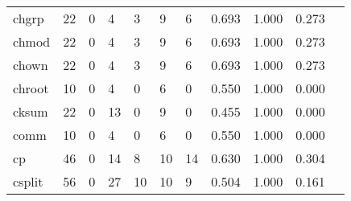 \begin{longtable}{lp{1.10cm}p{1.10cm}p{1.10cm}p{1.10cm}p{1.10cm}p{1.10cm}p{1.10cm}p{1.10cm}p{1.10cm}p{1.10cm}}
chgrp     &                     22 &                                  0 &                                 4 &                                3 &                                 9 &                               6 &                          0.693 &                                 1.000 &                               0.273 \\
chmod     &                     22 &                                  0 &                                 4 &                                3 &                                 9 &                               6 &                          0.693 &                                 1.000 &                               0.273 \\
chown     &                     22 &                                  0 &                                 4 &                                3 &                                 9 &                               6 &                          0.693 &                                 1.000 &                               0.273 \\
chroot    &                     10 &                                  0 &                                 4 &                                0 &                                 6 &                               0 &                          0.550 &                                 1.000 &                               0.000 \\
cksum     &                     22 &                                  0 &                                13 &                                0 &                                 9 &                               0 &                          0.455 &                                 1.000 &                               0.000 \\
comm      &                     10 &                                  0 &                                 4 &                                0 &                                 6 &                               0 &                          0.550 &                                 1.000 &                               0.000 \\
cp        &                     46 &                                  0 &                                14 &                                8 &                                10 &                              14 &                          0.630 &                                 1.000 &                               0.304 \\
csplit    &                     56 &                                  0 &                                27 &                               10 &                                10 &                               9 &                          0.504 &                                 1.000 &                               0.161 \\

\end{longtable}
